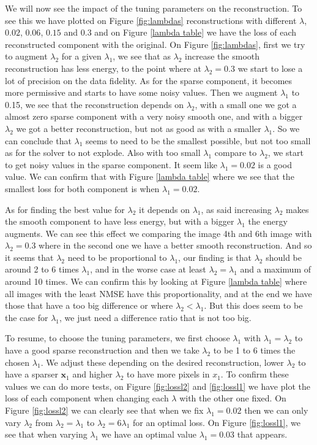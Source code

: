 \documentclass[a4paper,11pt,oneside]{report}
\theoremstyle{named}
\begin{document}
We will now see the impact of the tuning parameters on the reconstruction. To see this we have plotted on Figure \ref{fig:lambdas} reconstructions with different $\lambda$, $0.02$, $0.06$, $0.15$ and $0.3$ and on Figure \ref{lambda table} we have the loss of each reconstructed component with the original. On Figure \ref{fig:lambdas}, first we try to augment $\lambda_2$  for a given $\lambda_1$, we see that as $\lambda_2$ increase the smooth reconstruction has less energy, to the point where at $\lambda_2 = 0.3$ we start to lose a lot of precision on the data fidelity. As for the sparse component, it becomes more permissive and starts to have some noisy values. Then we augment $\lambda_1$ to 0.15, we see that the reconstruction depends on $\lambda_2$, with a small one we got a almost zero sparse component with a very noisy smooth one, and with a bigger $\lambda_2$ we got a better reconstruction, but not as good as with a smaller $\lambda_1$. So we can conclude that $\lambda_1$ seems to need to be the smallest possible, but not too small as for the solver to not explode. Also with too small $\lambda_1$ compare to $\lambda_2$, we start to get noisy values in the sparse component. It seem like $\lambda_1 = 0.02$ is a good value. We can confirm that with Figure \ref{lambda table} where we see that the smallest loss for both component is when $\lambda_1 = 0.02$. 

As for finding the best value for $\lambda_2$ it depends on $\lambda_1$, as said increasing $\lambda_2$ makes the smooth component to have less energy, but with a bigger $\lambda_1$ the energy augments. We can see this effect we comparing the image 4th and 6th image with $\lambda_2 = 0.3$ where in the second one we have a better smooth reconstruction. And so it seems that $\lambda_2$ need to be proportional to $\lambda_1$, our finding is that $\lambda_2$ should be around 2 to 6 times $\lambda_1$, and in the worse case at least $\lambda_2 = \lambda_1$ and a maximum of around 10 times. We can confirm this by looking at Figure \ref{lambda table} where all images with the least NMSE have this proportionality, and at the end we have those that have a too big difference or where $\lambda_2 < \lambda_1$. But this does seem to be the case for $\lambda_1$, we just need a difference ratio that is not too big.

To resume, to choose the tuning parameters, we first choose $\lambda_1$ with $\lambda_1 = \lambda_2$ to have a good sparse reconstruction and then we take $\lambda_2$ to be 1 to 6 times the chosen $\lambda_1$. We adjust these depending on the desired reconstruction, lower $\lambda_2$ to have a sparser $\boldsymbol{x}_1$ and higher $\lambda_2$ to have more pixels in $x_1$. To confirm these values we can do more tests, on Figure \ref{fig:lossl2} and \ref{fig:lossl1} we have plot the loss of each component when changing each $\lambda$ with the other one fixed. On Figure \ref{fig:lossl2} we can clearly see that when we fix $\lambda_1 = 0.02$ then we can only vary $\lambda_2$ from $\lambda_2 = \lambda_1$ to $\lambda_2 = 6 \lambda_1$ for an optimal loss. On Figure \ref{fig:lossl1}, we see that when varying $\lambda_1$ we have an optimal value $\lambda_1 = 0.03$ that appears.
\end{document}
